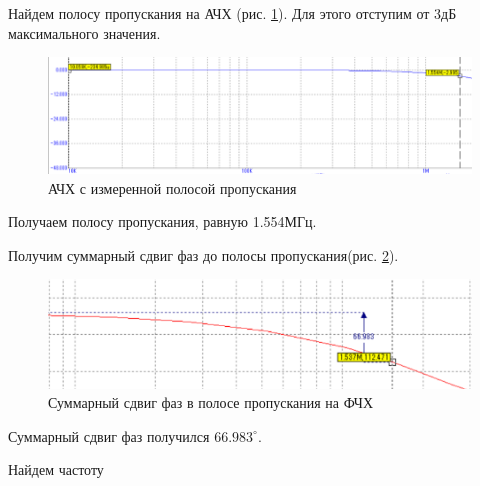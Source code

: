 \documentclass[a4paper,14pt]{article}
\begin{document}
Найдем полосу пропускания на АЧХ (рис. \ref{fig:achh}). Для этого отступим от 3дБ максимального значения. 

\begin{figure}[H]
	\centering
	\includegraphics[width=0.7\linewidth]{image/ACHH}
	\caption{АЧХ с измеренной полосой пропускания}
	\label{fig:achh}
\end{figure}

Получаем полосу пропускания, равную 1.554МГц.

Получим суммарный сдвиг фаз до полосы пропускания(рис. \ref{fig:afh}).

\begin{figure}[H]
	\centering
	\includegraphics[width=0.7\linewidth]{image/AFH}
	\caption{Суммарный сдвиг фаз в полосе пропускания на ФЧХ}
	\label{fig:afh}
\end{figure}

Суммарный сдвиг фаз получился $66.983^{\circ}$.

Найдем частоту

 
\end{document}
